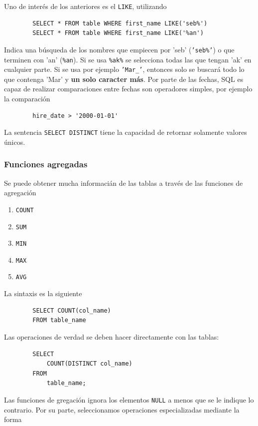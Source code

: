         Uno de interés de los anteriores es el \texttt{LIKE}, utilizando
        \begin{verbatim}
        SELECT * FROM table WHERE first_name LIKE('seb%')
        SELECT * FROM table WHERE first_name LIKE('%an')
        \end{verbatim}
        Indica una búsqueda de los nombres que empiecen por 'seb' (\texttt{'seb\%'}) o que terminen con 'an' (\texttt{\%an}). Si se usa \texttt{\%ak\%} se selecciona todas las que tengan 'ak' en cualquier parte. Si se usa por ejemplo \texttt{'Mar\_'}, entonces solo se buscará todo lo que contenga 'Mar' y \textbf{un solo caracter más}. Por parte de las fechas, SQL es capaz de realizar comparaciones entre fechas son operadores simples, por ejemplo la comparación
        \begin{verbatim} 
        hire_date > '2000-01-01'
        \end{verbatim}
        La sentencia \texttt{SELECT DISTINCT} tiene la capacidad de retornar solamente valores únicos.

        \subsubsection{Funciones agregadas}

        Se puede obtener mucha informacián de las tablas a través de las funciones de agregación 

        \begin{enumerate}
            \item \texttt{COUNT}
            \item \texttt{SUM}
            \item \texttt{MIN}
            \item \texttt{MAX}
            \item \texttt{AVG}
        \end{enumerate}

        La sintaxis es la siguiente
        \begin{verbatim}
        SELECT COUNT(col_name)
        FROM table_name
        \end{verbatim}
        Las operaciones de verdad se deben hacer directamente con las tablas:

        \begin{verbatim}
        SELECT
            COUNT(DISTINCT col_name)
        FROM
            table_name;
        \end{verbatim}
        Las funciones de gregación ignora los elementos \texttt{NULL} a menos que se le indique lo contrario. Por su parte, seleccionamos operaciones especializadas mediante la forma

